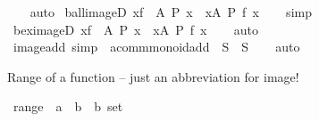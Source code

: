 \begin{isabellebody}
%
\isadelimproof
\ \ %
\endisadelimproof
%
\isatagproof
{}\isamarkupfalse%
\ auto%
\endisatagproof
{\isafoldproof}%
%
\isadelimproof
\isanewline
%
\endisadelimproof
\isanewline
{}\isamarkupfalse%
\ ball{\isacharunderscore}{\kern0pt}imageD{\isacharcolon}{\kern0pt}\ {\isachardoublequoteopen}{\isasymforall}x{\isasymin}f\ {\isacharbackquote}{\kern0pt}\ A{\isachardot}{\kern0pt}\ P\ x\ {\isasymLongrightarrow}\ {\isasymforall}x{\isasymin}A{\isachardot}{\kern0pt}\ P\ {\isacharparenleft}{\kern0pt}f\ x{\isacharparenright}{\kern0pt}{\isachardoublequoteclose}\isanewline
%
\isadelimproof
\ \ %
\endisadelimproof
%
\isatagproof
{}\isamarkupfalse%
\ simp%
\endisatagproof
{\isafoldproof}%
%
\isadelimproof
\isanewline
%
\endisadelimproof
\isanewline
{}\isamarkupfalse%
\ bex{\isacharunderscore}{\kern0pt}imageD{\isacharcolon}{\kern0pt}\ {\isachardoublequoteopen}{\isasymexists}x{\isasymin}f\ {\isacharbackquote}{\kern0pt}\ A{\isachardot}{\kern0pt}\ P\ x\ {\isasymLongrightarrow}\ {\isasymexists}x{\isasymin}A{\isachardot}{\kern0pt}\ P\ {\isacharparenleft}{\kern0pt}f\ x{\isacharparenright}{\kern0pt}{\isachardoublequoteclose}\isanewline
%
\isadelimproof
\ \ %
\endisadelimproof
%
\isatagproof
{}\isamarkupfalse%
\ auto%
\endisatagproof
{\isafoldproof}%
%
\isadelimproof
\isanewline
%
\endisadelimproof
\isanewline
{}\isamarkupfalse%
\ image{\isacharunderscore}{\kern0pt}add{\isacharunderscore}{\kern0pt}{}\ {\isacharbrackleft}{\kern0pt}simp{\isacharbrackright}{\kern0pt}{\isacharcolon}{\kern0pt}\ {\isachardoublequoteopen}{\isacharparenleft}{\kern0pt}{\isacharplus}{\kern0pt}{\isacharparenright}{\kern0pt}\ {\isacharparenleft}{\kern0pt}{}{\isacharcolon}{\kern0pt}{\isacharcolon}{\kern0pt}{\isacharprime}{\kern0pt}a{\isacharcolon}{\kern0pt}{\isacharcolon}{\kern0pt}comm{\isacharunderscore}{\kern0pt}monoid{\isacharunderscore}{\kern0pt}add{\isacharparenright}{\kern0pt}\ {\isacharbackquote}{\kern0pt}\ S\ {\isacharequal}{\kern0pt}\ S{\isachardoublequoteclose}\isanewline
%
\isadelimproof
\ \ %
\endisadelimproof
%
\isatagproof
{}\isamarkupfalse%
\ auto%
\endisatagproof
{\isafoldproof}%
%
\isadelimproof
%
\endisadelimproof
%
\begin{isamarkuptext}%
\medskip Range of a function -- just an abbreviation for image!%
\end{isamarkuptext}\isamarkuptrue%
\isamarkupfalse%
\ range\ {\isacharcolon}{\kern0pt}{\isacharcolon}{\kern0pt}\ {\isachardoublequoteopen}{\isacharparenleft}{\kern0pt}{\isacharprime}{\kern0pt}a\ {\isasymRightarrow}\ {\isacharprime}{\kern0pt}b{\isacharparenright}{\kern0pt}\ {\isasymRightarrow}\ {\isacharprime}{\kern0pt}b\ set{\isachardoublequoteclose}\ \ %

\end{isabellebody}
